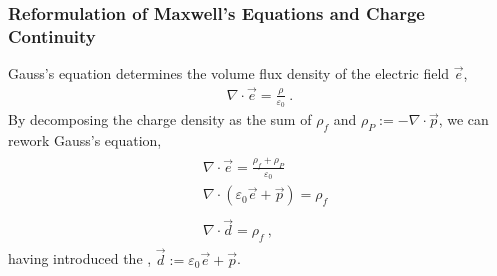 \documentclass[letterpaper,10pt,english]{jupyterBook}
\begin{document}
\subsubsection{Reformulation of Maxwell’s Equations and Charge Continuity}
\label{\detokenize{ch/principles-matter-polarization:reformulation-of-maxwell-s-equations-and-charge-continuity}}
\sphinxAtStartPar
Gauss’s equation determines the volume flux density of the electric field \(\vec{e}\),
\begin{equation*}
\begin{split}\nabla \cdot \vec{e} = \frac{\rho}{\varepsilon_0} \ .\end{split}
\end{equation*}
\sphinxAtStartPar
By decomposing the charge density as the sum of  \(\rho_f\) and  \(\rho_P := - \nabla \cdot \vec{p}\), we can rework Gauss’s equation,
\begin{equation*}
\begin{split}\begin{aligned}
 & \nabla \cdot \vec{e} = \frac{\rho_f + \rho_P}{\varepsilon_0} \\
 & \nabla \cdot \left( \varepsilon_0 \vec{e} + \vec{p} \right) = \rho_f \\ \\
 & \nabla \cdot \vec{d} = \rho_f \ ,
\end{aligned}\end{split}
\end{equation*}
\sphinxAtStartPar
having introduced the , \(\vec{d} := \varepsilon_0 \vec{e} + \vec{p}\).
\end{document}

